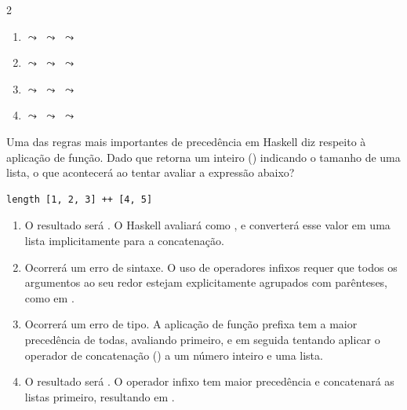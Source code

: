 \documentclass[a4paper,10pt,brazil]{article}
\begin{document}
\begin{multicols}{2}
\begin{enumerate}
  \item {} $\leadsto$  $\leadsto$  $\leadsto$ 

  \item {} $\leadsto$  $\leadsto$  $\leadsto$ 

  \item {} $\leadsto$  $\leadsto$  $\leadsto$ 

  \item {} $\leadsto$  $\leadsto$  $\leadsto$ 


\end{enumerate}

Uma das regras mais importantes de precedência em Haskell diz respeito à aplicação de função. Dado que  retorna um inteiro () indicando o tamanho de uma lista, o que acontecerá ao tentar avaliar a expressão abaixo?
\begin{verbatim}
length [1, 2, 3] ++ [4, 5]
\end{verbatim}

\begin{enumerate}
  \item O resultado será \haskellinline{[3, 4, 5]}. O Haskell avaliará  como , e converterá esse valor em uma lista implicitamente para a concatenação.

  \item Ocorrerá um erro de sintaxe. O uso de operadores infixos requer que todos os argumentos ao seu redor estejam explicitamente agrupados com parênteses, como em .

  \item Ocorrerá um erro de tipo. A aplicação de função prefixa tem a maior precedência de todas, avaliando  primeiro, e em seguida tentando aplicar o operador de concatenação (\haskellinline{++}) a um número inteiro e uma lista.

  \item O resultado será . O operador infixo \haskellinline{++} tem maior precedência e concatenará as listas primeiro, resultando em .


\end{enumerate}
\end{multicols}
\end{document}
